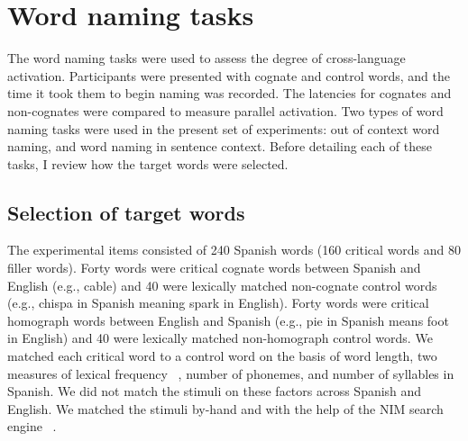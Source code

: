 \section{Word naming tasks}
\label{wordnamingtasks}

The word naming tasks were used to assess the degree of cross-language activation. Participants were presented with cognate and control words, and the time it took them to begin naming was recorded. The latencies for cognates and non-cognates were compared to measure parallel activation. Two types of word naming tasks were used in the present set of experiments: out of context word naming, and word naming in sentence context. Before detailing each of these tasks, I review how the target words were selected. 

\subsection{Selection of target words}
\label{selectionoftargetwords}

The experimental items consisted of 240 Spanish words (160 critical words and 80 filler words). Forty words were critical cognate words between Spanish and English (e.g., cable) and 40 were lexically matched non-cognate control words (e.g., chispa in Spanish meaning spark in English). Forty words were critical homograph words between English and Spanish (e.g., pie in Spanish means foot in English) and 40 were lexically matched non-homograph control words. We matched each critical word to a control word on the basis of word length, two measures of lexical frequency ~\citep{Alameda1995, Sebastian-Galles2000}, number of phonemes, and number of syllables in Spanish. We did not match the stimuli on these factors across Spanish and English. We matched the stimuli by-hand and with the help of the NIM search engine ~\citep{Guasch2013}.

